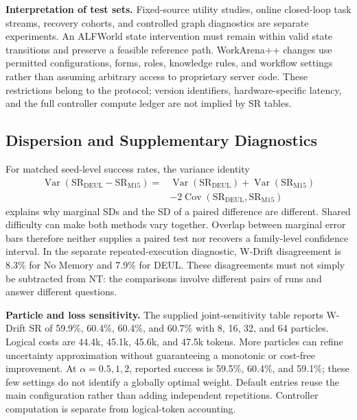 \documentclass[sigconf,anonymous,review]{acmart}
\DeclareMathOperator{\Cov}{Cov}
\DeclareMathOperator{\Var}{Var}
\theoremstyle{zhplain}
\begin{document}
\textbf{Interpretation of test sets.} Fixed-source utility studies, online closed-loop task streams, recovery cohorts, and controlled graph diagnostics are separate experiments. An ALFWorld state intervention must remain within valid state transitions and preserve a feasible reference path. WorkArena++ changes use permitted configurations, forms, roles, knowledge rules, and workflow settings rather than assuming arbitrary access to proprietary server code. These restrictions belong to the protocol; version identifiers, hardware-specific latency, and the full controller compute ledger are not implied by SR tables.

\subsection{Dispersion and Supplementary Diagnostics}
For matched seed-level success rates, the variance identity
\begin{equation}
\begin{aligned}
\Var(\mathrm{SR}_{\mathrm{DEUL}}-\mathrm{SR}_{\mathrm{M15}})
={}&\Var(\mathrm{SR}_{\mathrm{DEUL}})+\Var(\mathrm{SR}_{\mathrm{M15}})\\
&-2\Cov(\mathrm{SR}_{\mathrm{DEUL}},\mathrm{SR}_{\mathrm{M15}})
\end{aligned}
\end{equation}
explains why marginal SDs and the SD of a paired difference are different. Shared difficulty can make both methods vary together. Overlap between marginal error bars therefore neither supplies a paired test nor recovers a family-level confidence interval. In the separate repeated-execution diagnostic, W-Drift disagreement is 8.3\% for No Memory and 7.9\% for DEUL. These disagreements must not simply be subtracted from NT: the comparisons involve different pairs of runs and answer different questions.

\textbf{Particle and loss sensitivity.} The supplied joint-sensitivity table reports W-Drift SR of 59.9\%, 60.4\%, 60.4\%, and 60.7\% with 8, 16, 32, and 64 particles. Logical costs are 44.4k, 45.1k, 45.6k, and 47.5k tokens. More particles can refine uncertainty approximation without guaranteeing a monotonic or cost-free improvement. At \(\alpha=0.5,1,2\), reported success is 59.5\%, 60.4\%, and 59.1\%; these few settings do not identify a globally optimal weight. Default entries reuse the main configuration rather than adding independent repetitions. Controller computation is separate from logical-token accounting.
\end{document}
